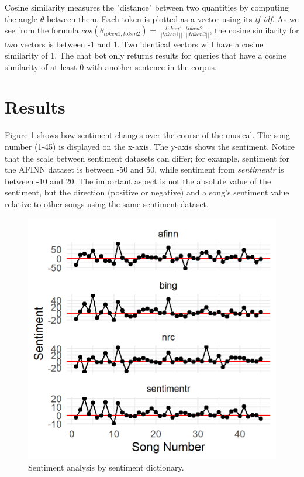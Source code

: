 \documentclass{article}
\begin{document}
Cosine similarity measures the "distance" between two quantities by computing the angle $\theta$ between them. Each token is plotted as a vector using its \emph{tf-idf}. As we see from the formula $cos(\theta_{token1, token2}) = \frac {token1 \cdot token2}{||token1|| \cdot ||token2||}$, the cosine similarity for two vectors is between -1 and 1. Two identical vectors will have a cosine similarity of 1. The chat bot only returns results for queries that have a cosine similarity of at least 0 with another sentence in the corpus. 

\section{Results}

Figure \ref{fig:sentiment} shows how sentiment changes over the course of the musical. The song number (1-45) is displayed on the x-axis. The y-axis shows the sentiment. Notice that the scale between sentiment datasets can differ; for example, sentiment for the AFINN dataset is between -50 and 50, while sentiment from \emph{sentimentr} is between -10 and 20. The important aspect is not the absolute value of the sentiment, but the direction (positive or negative) and a song's sentiment value relative to other songs using the same sentiment dataset. 

\begin{figure}[h]
    \caption{Sentiment analysis by sentiment dictionary. \label{fig:sentiment}}
    \centering
    \includegraphics[width=0.2\paperwidth]{sentiment_by_stopwords.png}
\end{figure}
\end{document}
